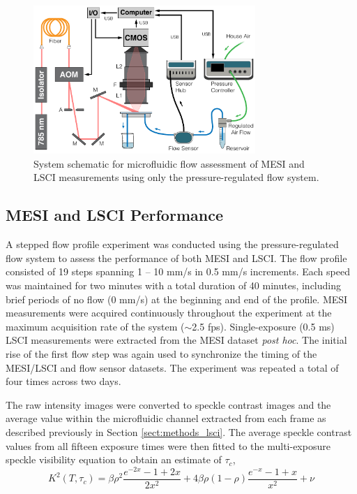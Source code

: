 \documentclass[12pt]{spieman}
\begin{document}
\begin{spacing}{2}
\begin{figure}
    \centering
    \includegraphics[width=0.75\textwidth]{Figure3.pdf}
    \caption {
        System schematic for microfluidic flow assessment of MESI and LSCI measurements using only the pressure-regulated flow system.
    }
    \label{fig:system_mesi}
\end{figure}


\subsection{MESI and LSCI Performance}

A stepped flow profile experiment was conducted using the pressure-regulated flow system to assess the performance of both MESI and LSCI. The flow profile consisted of 19 steps spanning 1 -- 10 mm/s in 0.5 mm/s increments. Each speed was maintained for two minutes with a total duration of 40 minutes, including brief periods of no flow (0 mm/s) at the beginning and end of the profile. MESI measurements were acquired continuously throughout the experiment at the maximum acquisition rate of the system ($\sim$2.5 fps). Single-exposure (0.5 ms) LSCI measurements were extracted from the MESI dataset \textit{post hoc}. The initial rise of the first flow step was again used to synchronize the timing of the MESI/LSCI and flow sensor datasets. The experiment was repeated a total of four times across two days.

The raw intensity images were converted to speckle contrast images and the average value within the microfluidic channel extracted from each frame as described previously in Section \ref{sect:methods_lsci}. The average speckle contrast values from all fifteen exposure times were then fitted to the multi-exposure speckle visibility equation \cite{Parthasarathy:2008el} to obtain an estimate of $\tau_c$,
%
\begin{equation}
    \label{eq:mesi}
    K^2(T,\tau_c) =
        \beta\rho^2\frac{e^{-2x} - 1 + 2x}{2x^2} +
        4\beta\rho(1 - \rho)\frac{e^{-x} - 1 + x}{x^2} +
        \nu
\end{equation}


\end{spacing}
\end{document}
